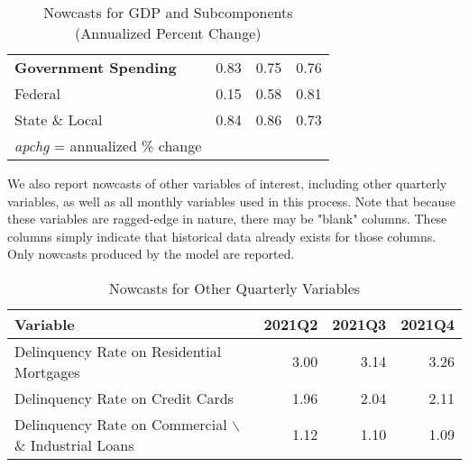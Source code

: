 \documentclass[11pt, letterpaper]{article}\usepackage[]{graphicx}\usepackage[]{color}
\begin{document}
\begin{table}[H]
\begin{tabular}{lrrr}
  \hspace{0mm} \textbf{Government Spending} & 0.83 & 0.75 & 0.76 \\ 
  \hspace{8mm}  Federal & 0.15 & 0.58 & 0.81 \\ 
  \hspace{8mm}  State \& Local & 0.84 & 0.86 & 0.73 \\ 
   \hline 
 \textit{apchg} = annualized \% change 
\end{tabular}
\endgroup
\caption{Nowcasts for GDP and Subcomponents (Annualized Percent Change)} 
\end{table}


We also report nowcasts of other variables of interest, including other quarterly variables, as well as all monthly variables used in this process. Note that because these variables are ragged-edge in nature, there may be "blank" columns. These columns simply indicate that historical data already exists for those columns. Only nowcasts produced by the model are reported.
\begin{table}[H]
\centering
\begingroup\fontsize{11pt}{13pt}\selectfont
\begin{tabular}{lrrr}
  \hline
Variable & 2021Q2 & 2021Q3 & 2021Q4 \\ 
  \hline
Delinquency Rate on Residential Mortgages & 3.00 & 3.14 & 3.26 \\ 
  Delinquency Rate on Credit Cards & 1.96 & 2.04 & 2.11 \\ 
  Delinquency Rate on Commercial $\backslash$\& Industrial Loans & 1.12 & 1.10 & 1.09 \\ 
   \hline
\end{tabular}
\endgroup
\caption{Nowcasts for Other Quarterly Variables} 
\end{table}
\end{document}

